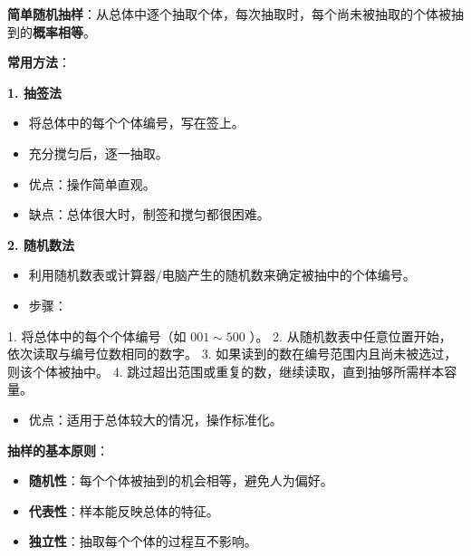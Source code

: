 \begin{understand}


\textbf{简单随机抽样}：从总体中逐个抽取个体，每次抽取时，每个尚未被抽取的个体被抽到的\textbf{概率相等}。

\textbf{常用方法}：

\textbf{1. 抽签法}
\begin{itemize}
  \item 将总体中的每个个体编号，写在签上。
  \item 充分搅匀后，逐一抽取。
  \item 优点：操作简单直观。
  \item 缺点：总体很大时，制签和搅匀都很困难。
\end{itemize}


\textbf{2. 随机数法}
\begin{itemize}
  \item 利用随机数表或计算器/电脑产生的随机数来确定被抽中的个体编号。
  \item 步骤：
\end{itemize}

  1. 将总体中的每个个体编号（如 $001 \sim 500$ ）。
  2. 从随机数表中任意位置开始，依次读取与编号位数相同的数字。
  3. 如果读到的数在编号范围内且尚未被选过，则该个体被抽中。
  4. 跳过超出范围或重复的数，继续读取，直到抽够所需样本容量。
\begin{itemize}
  \item 优点：适用于总体较大的情况，操作标准化。
\end{itemize}


\textbf{抽样的基本原则}：
\begin{itemize}
  \item \textbf{随机性}：每个个体被抽到的机会相等，避免人为偏好。
  \item \textbf{代表性}：样本能反映总体的特征。
  \item \textbf{独立性}：抽取每个个体的过程互不影响。
\end{itemize}


\end{understand}

